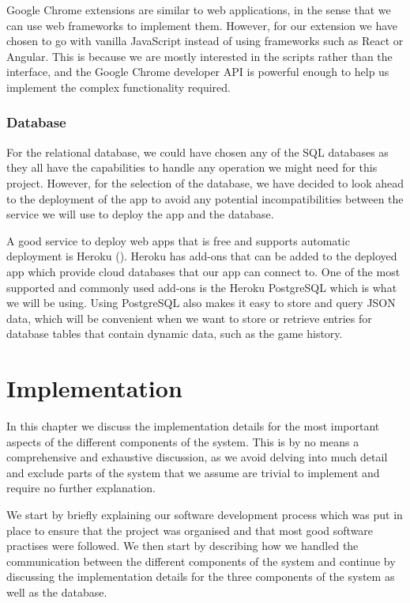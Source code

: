 \documentclass{l4proj}
\begin{document}
Google Chrome extensions are similar to web applications, in the sense that we can use web frameworks to implement them. However, for our extension we have chosen to go with vanilla JavaScript instead of using frameworks such as React or Angular.
This is because we are mostly interested in the scripts rather than the interface, and the Google Chrome developer API is powerful enough to help us implement the complex functionality required.

\subsection{Database}
For the relational database, we could have chosen any of the SQL databases as they all have the capabilities to handle any operation we might need for this project. However, for the selection of the database, we have decided to look ahead to the deployment of the 
app to avoid any potential incompatibilities between the service we will use to deploy the app and the database. 

A good service to deploy web apps that is free and supports automatic deployment is Heroku (\cite{heroku}). Heroku has add-ons that can be added to the deployed app which provide cloud databases that
our app can connect to. One of the most supported and commonly used add-ons is the Heroku PostgreSQL which is what we will be using. Using PostgreSQL also makes it easy to store and query JSON data, which will be convenient when we want to store or retrieve entries for database tables that contain dynamic data, such as the game history.

\chapter{Implementation}
\label{implementation}

In this chapter we discuss the implementation details for the most important aspects of the different components of the system. This is by no means a comprehensive and exhaustive discussion, as we avoid delving into much detail and exclude parts of the system that we assume are trivial to implement and require no further explanation. 

We start by briefly explaining our software development process which was put in place to ensure that the project was organised and that most good software practises were followed. We then start by describing how we handled the communication between the different components of the system and continue by discussing the implementation details for the three components of the system as well as the database.
\end{document}
